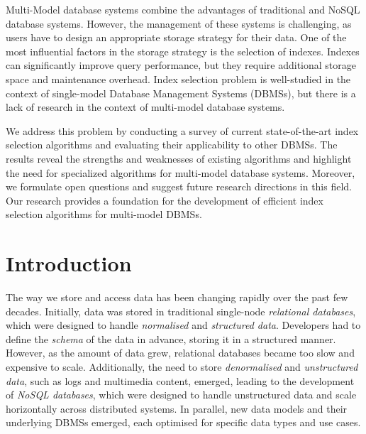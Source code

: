 Multi-Model database systems combine the advantages of traditional and NoSQL database systems. However, the management of these systems is challenging, as users have to design an appropriate storage strategy for their data. One of the most influential factors in the storage strategy is the selection of indexes. Indexes can significantly improve query performance, but they require additional storage space and maintenance overhead. Index selection problem is well-studied in the context of single-model Database Management Systems (DBMSs), but there is a lack of research in the context of multi-model database systems.

We address this problem by conducting a survey of current state-of-the-art index selection algorithms and evaluating their applicability to other DBMSs. The results reveal the strengths and weaknesses of existing algorithms and highlight the need for specialized algorithms for multi-model database systems. Moreover, we formulate open questions and suggest future research directions in this field. Our research provides a foundation for the development of efficient index selection algorithms for multi-model DBMSs.







\section{Introduction}

The way we store and access data has been changing rapidly over the past few decades. Initially, data was stored in traditional single-node \textit{relational databases}, which were designed to handle \textit{normalised} and \textit{structured data}. Developers had to define the \textit{schema} of the data in advance, storing it in a structured manner. However, as the amount of data grew, relational databases became too slow and expensive to scale. Additionally, the need to store \textit{denormalised} and \textit{unstructured data}, such as logs and multimedia content, emerged, leading to the development of \textit{NoSQL databases}, which were designed to handle unstructured data and scale horizontally across distributed systems. In parallel, new data models and their underlying DBMSs emerged, each optimised for specific data types and use cases.


